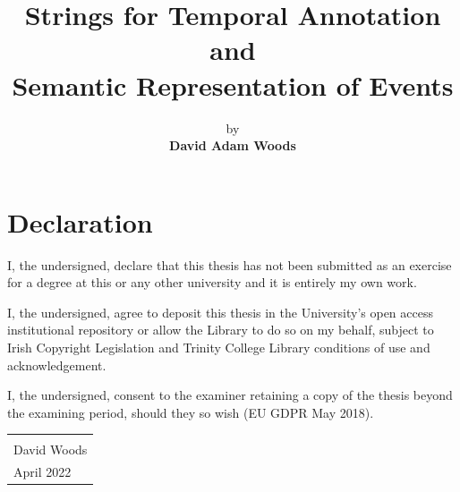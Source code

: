 \documentclass[a4paper,12pt,leqno,twoside]{article}
\title{\textbf{Strings for Temporal Annotation and\\Semantic Representation of Events}}
\author{by\\{\textbf{David Adam Woods}}\bigskip\bigskip}
\date{\parbox{\linewidth}{\centering%
		{\large A dissertation submitted\\in fulfillment of the requirements\\for the Degree of\\\textbf{Doctor of Philosophy}}\\		
		\bigskip\bigskip\bigskip
		{\Large \textbf{University of Dublin, Trinity College}}\\\endgraf April 2022%
		}{\small \vspace{\fill} Supervised by: Dr Tim Fernando, Dr Carl Vogel}}
\begin{document}
\maketitle
\thispagestyle{empty}

\newpage
{}
\section*{Declaration}
\noindent
I, the undersigned, declare that this thesis has not been submitted as an exercise for a degree at this or any other university and it is entirely my own work.\par

\vspace{2em}

\noindent
I, the undersigned, agree to deposit this thesis in the University's open access institutional repository or allow the Library to do so on my behalf, subject to Irish Copyright Legislation and Trinity College Library conditions of use and acknowledgement.\par

\vspace{2em}

\noindent
I, the undersigned, consent to the examiner retaining a copy of the thesis beyond the examining period, should they so wish (EU GDPR May 2018).

\vspace{\fill}

\begin{table}[!htbp]
	\flushright
	\begin{tabular}{l}
		\makebox[10cm]{\hrulefill}\\[0.5cm]
		David Woods\\[0.25cm]
		April 2022%
	\end{tabular}
\end{table}

\vspace{5em}
\end{document}
